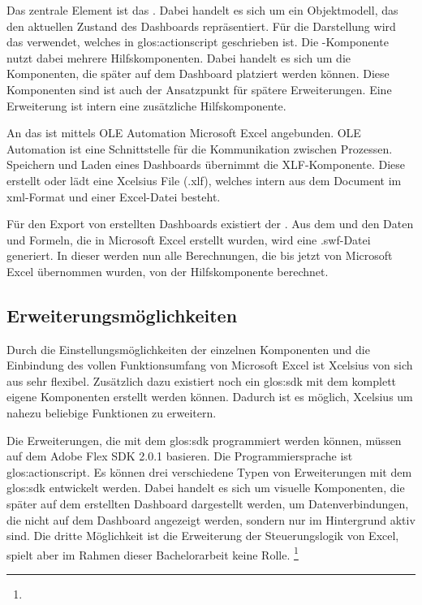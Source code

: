 \begin{onehalfspacing}
Das zentrale Element ist das . Dabei handelt es sich um ein Objektmodell, das den aktuellen Zustand des Dashboards repräsentiert. Für die Darstellung wird das  verwendet, welches in \gls{glos:actionscript} geschrieben ist. Die -Komponente nutzt dabei mehrere Hilfskomponenten. Dabei handelt es sich um die Komponenten, die später auf dem Dashboard platziert werden können. Diese Komponenten sind ist auch der Ansatzpunkt für spätere Erweiterungen. Eine Erweiterung ist intern eine zusätzliche Hilfskomponente.

An das  ist mittels OLE Automation Microsoft Excel angebunden. OLE Automation ist eine Schnittstelle für die Kommunikation zwischen Prozessen. Speichern und Laden eines Dashboards übernimmt die XLF-Komponente. Diese erstellt oder lädt eine \gls{Xcelsius} File (.xlf), welches intern aus dem Document im \gls{xml}-Format und einer Excel-Datei besteht.

Für den Export von erstellten Dashboards existiert der . Aus dem  und den Daten und Formeln, die in Microsoft Excel erstellt wurden, wird eine .swf-Datei generiert. In dieser werden nun alle Berechnungen, die bis jetzt von Microsoft Excel übernommen wurden, von der Hilfskomponente  berechnet.

\subsection{Erweiterungsmöglichkeiten}

Durch die Einstellungsmöglichkeiten der einzelnen Komponenten und die Einbindung des vollen Funktionsumfang von Microsoft Excel ist \gls{Xcelsius} von sich aus sehr flexibel. Zusätzlich dazu existiert noch ein \gls{glos:sdk} mit dem komplett eigene Komponenten erstellt werden können. Dadurch ist es möglich, \gls{Xcelsius} um nahezu beliebige Funktionen zu erweitern.

Die Erweiterungen, die mit dem \gls{glos:sdk} programmiert werden können, müssen auf dem Adobe Flex SDK 2.0.1 basieren. Die Programmiersprache ist \gls{glos:actionscript}. Es können drei verschiedene Typen von Erweiterungen mit dem \gls{glos:sdk} entwickelt werden. Dabei handelt es sich um visuelle Komponenten, die später auf dem erstellten Dashboard dargestellt werden, um Datenverbindungen, die nicht auf dem Dashboard angezeigt werden, sondern nur im Hintergrund aktiv sind. Die dritte Möglichkeit ist die Erweiterung der Steuerungslogik von Excel, spielt aber im Rahmen dieser Bachelorarbeit keine Rolle. \footnote{ }


\end{onehalfspacing}

